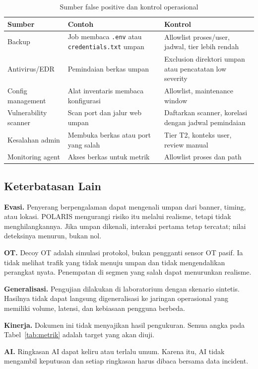 \documentclass[12pt,a4paper]{article}
\begin{document}
\begin{table}[htbp]
\centering
\caption{Sumber false positive dan kontrol operasional}
\label{tab:fp}
\footnotesize
\begin{tabularx}{\textwidth}{@{}l X X@{}}
\toprule
\textbf{Sumber} & \textbf{Contoh} & \textbf{Kontrol} \\
\midrule
Backup & Job membaca \texttt{.env} atau \texttt{credentials.txt} umpan & Allowlist proses/user, jadwal, tier lebih rendah \\
Antivirus/EDR & Pemindaian berkas umpan & Exclusion direktori umpan atau pencatatan low severity \\
Config management & Alat inventaris membaca konfigurasi & Allowlist, maintenance window \\
Vulnerability scanner & Scan port dan jalur web umpan & Daftarkan scanner, korelasi dengan jadwal pemindaian \\
Kesalahan admin & Membuka berkas atau port yang salah & Tier T2, konteks user, review manual \\
Monitoring agent & Akses berkas untuk metrik & Allowlist proses dan path \\
\bottomrule
\end{tabularx}
\end{table}

\subsection{Keterbatasan Lain}

\textbf{Evasi.} Penyerang berpengalaman dapat mengenali umpan dari banner, timing, atau lokasi. POLARIS mengurangi risiko itu melalui realisme, tetapi tidak menghilangkannya. Jika umpan dikenali, interaksi pertama tetap tercatat; nilai deteksinya menurun, bukan nol.

\textbf{OT.} Decoy OT adalah simulasi protokol, bukan pengganti sensor OT pasif. Ia tidak melihat trafik yang tidak menuju umpan dan tidak mengendalikan perangkat nyata. Penempatan di segmen yang salah dapat menurunkan realisme.

\textbf{Generalisasi.} Pengujian dilakukan di laboratorium dengan skenario sintetis. Hasilnya tidak dapat langsung digeneralisasi ke jaringan operasional yang memiliki volume, latensi, dan kebiasaan pengguna berbeda.

\textbf{Kinerja.} Dokumen ini tidak menyajikan hasil pengukuran. Semua angka pada Tabel~\ref{tab:metrik} adalah target yang akan diuji.

\textbf{AI.} Ringkasan AI dapat keliru atau terlalu umum. Karena itu, AI tidak mengambil keputusan dan setiap ringkasan harus dibaca bersama data incident.
\end{document}
